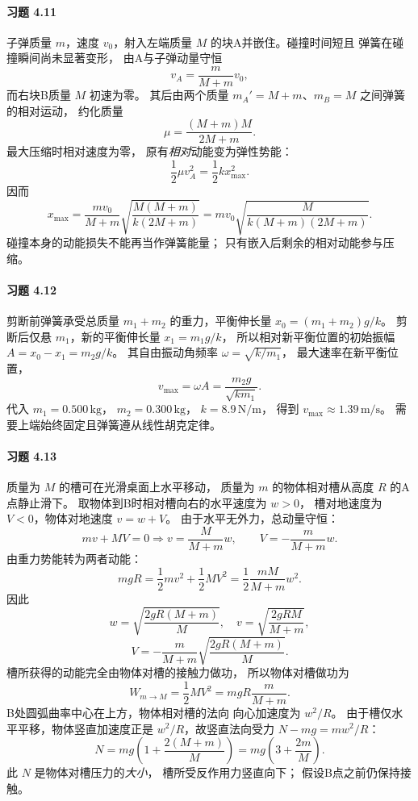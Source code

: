 \paragraph{习题 4.11}
子弹质量 \(m\)，速度 \(v_0\)，射入左端质量
\(M\) 的块A并嵌住。碰撞时间短且
弹簧在碰撞瞬间尚未显著变形，
由A与子弹动量守恒
\[
 v_A=\frac{m}{M+m}v_0,
\]
而右块B质量 \(M\) 初速为零。
其后由两个质量 \(m_A'=M+m\)、\(m_B=M\)
之间弹簧的相对运动，
约化质量
\[
 \mu=\frac{(M+m)M}{2M+m}.
\]
最大压缩时相对速度为零，
原有\emph{相对}动能变为弹性势能：
\[
 \frac12\mu v_A^2=\frac12kx_{\max}^2.
\]
因而
\[
 \boxed{x_{\max}=\frac{mv_0}{M+m}
 \sqrt{\frac{M(M+m)}{k(2M+m)}}}
 =\boxed{mv_0
 \sqrt{\frac{M}{k(M+m)(2M+m)}}}.
\]
碰撞本身的动能损失不能再当作弹簧能量；
只有嵌入后剩余的相对动能参与压缩。

\paragraph{习题 4.12}
剪断前弹簧承受总质量
\(m_1+m_2\) 的重力，平衡伸长量
\(x_0=(m_1+m_2)g/k\)。
剪断后仅悬 \(m_1\)，新的平衡伸长量
\(x_1=m_1g/k\)，
所以相对新平衡位置的初始振幅
\(A=x_0-x_1=m_2g/k\)。
其自由振动角频率
\(\omega=\sqrt{k/m_1}\)，
最大速率在新平衡位置，
\[
 \boxed{v_{\max}=\omega A
 =\frac{m_2g}{\sqrt{km_1}}}.
\]
代入 \(m_1=0.500\,\mathrm{kg}\)，
\(m_2=0.300\,\mathrm{kg}\)，
\(k=8.9\,\mathrm{N/m}\)，
得到
\(\boxed{v_{\max}\approx1.39\,\mathrm{m/s}}\)。
需要上端始终固定且弹簧遵从线性胡克定律。

\paragraph{习题 4.13}
质量为 \(M\) 的槽可在光滑桌面上水平移动，
质量为 \(m\) 的物体相对槽从高度 \(R\) 的A点静止滑下。
取物体到B时相对槽向右的水平速度为 \(w>0\)，
槽对地速度为 \(V<0\)，物体对地速度
\(v=w+V\)。
由于水平无外力，总动量守恒：
\[
 mv+MV=0 \Longrightarrow
 v=\frac{M}{M+m}w,\qquad
 V=-\frac{m}{M+m}w.
\]
由重力势能转为两者动能：
\[
 mgR=\frac12mv^2+\frac12MV^2
 =\frac12\frac{mM}{M+m}w^2.
\]
因此
\[
 \boxed{w=\sqrt{\frac{2gR(M+m)}M}},\quad
 \boxed{v=\sqrt{\frac{2gRM}{M+m}}},
\]
\[
 \boxed{V=-\frac{m}{M+m}
 \sqrt{\frac{2gR(M+m)}M}}.
\]
槽所获得的动能完全由物体对槽的接触力做功，
所以物体对槽做功为
\[
 \boxed{W_{m\to M}=\frac12MV^2
 =mgR\frac{m}{M+m}}.
\]
B处圆弧曲率中心在上方，物体相对槽的法向
向心加速度为 \(w^2/R\)。
由于槽仅水平平移，物体竖直加速度正是
\(w^2/R\)，故竖直法向受力
\(N-mg=mw^2/R\)：
\[
 \boxed{N=mg\left(1+
 \frac{2(M+m)}{M}\right)
 =mg\left(3+\frac{2m}M\right)}.
\]
此 \(N\) 是物体对槽压力的\emph{大小}，
槽所受反作用力竖直向下；
假设B点之前仍保持接触。

